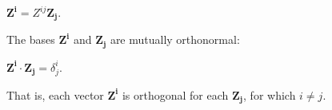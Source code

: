 \documentclass[12pt, a4paper]{article}
\begin{document}
        \centerline{$\mathbf{Z^i}=Z^{ij}\mathbf{Z_j}$.}
        
\vspace{4mm}

    The bases $\mathbf{Z^i}$ and $\mathbf{Z_j}$ are mutually orthonormal:\par
    
\vspace{4mm}

        \centerline{$\mathbf{Z^i}\cdot\mathbf{Z_j}=\delta^i_j$.}
        
\vspace{4mm}

    That is, each vector $\mathbf{Z^i}$ is orthogonal for each $\mathbf{Z_j}$, for which $i\neq j$.
    
\vspace{8mm}
\end{document}
